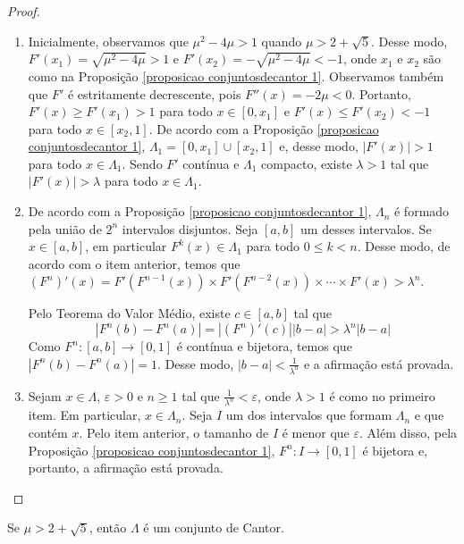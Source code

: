 \begin{proof}
\begin{enumerate}
\item Inicialmente, observamos que $\mu^2 - 4\mu > 1$ quando $\mu > 2 + \sqrt{5}$. Desse modo, $F'(x_1) = \sqrt{\mu^2 - 4\mu} > 1$ e $F'(x_2) = -\sqrt{\mu^2 - 4\mu} < -1$, onde $x_1$ e $x_2$ são como na Proposição \ref{proposicao conjuntosdecantor 1}. Observamos também que $F'$ é estritamente decrescente, pois $F''(x) = -2\mu < 0$.  Portanto, $F'(x) \geq F'(x_1) > 1$ para todo $x \in [0, x_1]$ e $F'(x) \leq F'(x_2) < -1$ para todo $x \in [x_2, 1]$. De acordo com a Proposição \ref{proposicao conjuntosdecantor 1}, $\Lambda_1 = [0, x_1] \cup [x_2, 1]$ e, desse modo, $|F'(x)| > 1$ para todo $x \in \Lambda_1$. Sendo $F'$ contínua e $\Lambda_1$ compacto, existe $\lambda > 1$ tal que $|F'(x)| > \lambda$ para todo $x \in \Lambda_1$.

\item De acordo com a Proposição \ref{proposicao conjuntosdecantor 1}, $\Lambda_n$ é formado pela união de $2^n$ intervalos disjuntos. Seja $[a, b]$ um desses intervalos. Se $x \in [a, b]$, em particular $F^k(x) \in \Lambda_1$ para todo $0 \leq k < n$. Desse modo, de acordo com o item anterior, temos que $(F^n)'(x) = F'(F^{n-1}(x)) \times F'(F^{n-2}(x)) \times \cdots \times F'(x) > \lambda^n$.

Pelo Teorema do Valor Médio, existe $c \in [a, b]$ tal que $$|F^n(b) - F^n(a)| = |(F^n)'(c)||b - a| > \lambda^n|b - a|$$ Como $F^n: [a, b] \to [0 ,1]$ é contínua e bijetora, temos que $|F^n(b) - F^n(a)| = 1$. Desse modo, $|b - a| < \frac{1}{\lambda^n}$ e a afirmação está provada.

\item  Sejam $x \in \Lambda$, $\varepsilon > 0$ e $n \geq 1$ tal que $\frac{1}{\lambda^n} < \varepsilon$, onde $\lambda > 1$ é como no primeiro item. Em particular, $x \in \Lambda_n$. Seja $I$ um dos intervalos que formam $\Lambda_n$ e que contém $x$. Pelo item anterior, o tamanho de $I$ é menor que $\varepsilon$. Além disso, pela Proposição \ref{proposicao conjuntosdecantor 1}, $F^n: I \to [0,1]$ é bijetora e, portanto, a afirmação está provada.
\end{enumerate}
\end{proof} 

\begin{theorem} \label{teorema conjuntosdecantor 1}
Se $\mu > 2 + \sqrt{5}$, então $\Lambda$ é um conjunto de Cantor.
\end{theorem}

